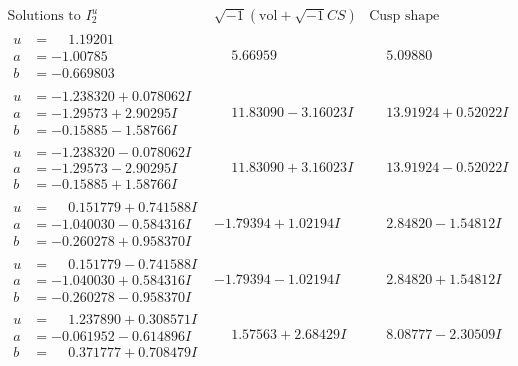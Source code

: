 \documentclass[1p]{elsarticle_modified}
\theoremstyle{definition}
\newcommand{\I}{\sqrt{-1}}
\begin{document}
$$\begin{array}{c|c|c}  
\text{Solutions to }I^u_{2}& \I (\text{vol} + \sqrt{-1}CS) & \text{Cusp shape}\\
 \hline 
\begin{aligned}
u &= \phantom{-}1.19201\phantom{ +0.000000I} \\
a &= -1.00785\phantom{ +0.000000I} \\
b &= -0.669803\phantom{ +0.000000I}\end{aligned}
 & \phantom{-}5.66959\phantom{ +0.000000I} & \phantom{-}5.09880\phantom{ +0.000000I} \\ \hline\begin{aligned}
u &= -1.238320 + 0.078062 I \\
a &= -1.29573 + 2.90295 I \\
b &= -0.15885 - 1.58766 I\end{aligned}
 & \phantom{-}11.83090 - 3.16023 I & \phantom{-}13.91924 + 0.52022 I \\ \hline\begin{aligned}
u &= -1.238320 - 0.078062 I \\
a &= -1.29573 - 2.90295 I \\
b &= -0.15885 + 1.58766 I\end{aligned}
 & \phantom{-}11.83090 + 3.16023 I & \phantom{-}13.91924 - 0.52022 I \\ \hline\begin{aligned}
u &= \phantom{-}0.151779 + 0.741588 I \\
a &= -1.040030 - 0.584316 I \\
b &= -0.260278 + 0.958370 I\end{aligned}
 & -1.79394 + 1.02194 I & \phantom{-}2.84820 - 1.54812 I \\ \hline\begin{aligned}
u &= \phantom{-}0.151779 - 0.741588 I \\
a &= -1.040030 + 0.584316 I \\
b &= -0.260278 - 0.958370 I\end{aligned}
 & -1.79394 - 1.02194 I & \phantom{-}2.84820 + 1.54812 I \\ \hline\begin{aligned}
u &= \phantom{-}1.237890 + 0.308571 I \\
a &= -0.061952 - 0.614896 I \\
b &= \phantom{-}0.371777 + 0.708479 I\end{aligned}
 & \phantom{-}1.57563 + 2.68429 I & \phantom{-}8.08777 - 2.30509 I \\ \hline\begin{aligned}

\end{aligned}
\end{array}$$
\end{document}
